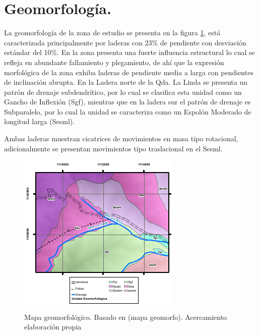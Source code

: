 \section{Geomorfolog\'{i}a.}
La geomorfolog\'{i}a de la zona de estudio se presenta en la figura \ref{fig:mapageomorfo}, est\'{a} caracterizada principalmente por laderas con 23\% de pendiente con desviaci\'{o}n est\'{a}ndar del 10\%.
En la zona presenta una fuerte influencia estructural lo cual se refleja en abundante fallamiento y plegamiento, de ah\'i que la expresi\'{o}n morfol\'{o}gica de la zona exhiba laderas de pendiente media a larga con pendientes de inclinaci\'{o}n abrupta. En la Ladera norte de la Qda. La Linda se presenta un patr\'{o}n de drenaje subdendr\'{i}tico, por lo cual se clasifica esta unidad como un Gancho de Inflexi\'{o}n (Sgf), mientras que en la ladera sur el patr\'{o}n de drenaje es Subparalelo, por lo cual la unidad se caracteriza como un Espol\'{o}n Moderado de longitud larga (Sesml). \cite{urrao}\par
Ambas laderas muestran cicatrices de movimientos en masa tipo rotacional, adicionalmente se presentan movimientos tipo traslacional en el Sesml. 
 \par


\begin{figure}[H]
\centering

\includegraphics[width=.8\textwidth]{img/geomorfo.pdf}
\caption{Mapa geomorfol\'{o}gico. Basado en (mapa geomorfo). Acercamiento elaboraci\'on propia}

\label{fig:mapageomorfo}
\end{figure}